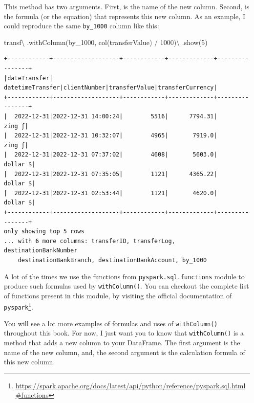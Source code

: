\documentclass[
  11pt,
  letterpaper,
  DIV=11,
  numbers=noendperiod]{scrreprt}
\newenvironment{Shaded}{\begin{snugshade}}{\end{snugshade}}
\newcommand{\DecValTok}[1]{\textcolor[rgb]{0.68,0.00,0.00}{#1}}
\newcommand{\NormalTok}[1]{\textcolor[rgb]{0.00,0.23,0.31}{#1}}
\newcommand{\OperatorTok}[1]{\textcolor[rgb]{0.37,0.37,0.37}{#1}}
\newcommand{\StringTok}[1]{\textcolor[rgb]{0.13,0.47,0.30}{#1}}
\begin{document}
This method has two arguments. First, is the name of the new column.
Second, is the formula (or the equation) that represents this new
column. As an example, I could reproduce the same \texttt{by\_1000}
column like this:

\begin{Shaded}
\begin{Highlighting}[]
\NormalTok{transf}\OperatorTok{\textbackslash{}}
\NormalTok{  .withColumn(}\StringTok{\textquotesingle{}by\_1000\textquotesingle{}}\NormalTok{, col(}\StringTok{\textquotesingle{}transferValue\textquotesingle{}}\NormalTok{) }\OperatorTok{/} \DecValTok{1000}\NormalTok{)}\OperatorTok{\textbackslash{}}
\NormalTok{  .show(}\DecValTok{5}\NormalTok{)}
\end{Highlighting}
\end{Shaded}

\begin{verbatim}
+------------+-------------------+------------+-------------+----------------+
|dateTransfer|   datetimeTransfer|clientNumber|transferValue|transferCurrency|
+------------+-------------------+------------+-------------+----------------+
|  2022-12-31|2022-12-31 14:00:24|        5516|      7794.31|          zing ƒ|
|  2022-12-31|2022-12-31 10:32:07|        4965|       7919.0|          zing ƒ|
|  2022-12-31|2022-12-31 07:37:02|        4608|       5603.0|        dollar $|
|  2022-12-31|2022-12-31 07:35:05|        1121|      4365.22|        dollar $|
|  2022-12-31|2022-12-31 02:53:44|        1121|       4620.0|        dollar $|
+------------+-------------------+------------+-------------+----------------+
only showing top 5 rows
... with 6 more columns: transferID, transferLog, destinationBankNumber
    destinationBankBranch, destinationBankAccount, by_1000
\end{verbatim}

A lot of the times we use the functions from
\texttt{pyspark.sql.functions} module to produce such formulas used by
\texttt{withColumn()}. You can checkout the complete list of functions
present in this module, by visiting the official documentation of
\texttt{pyspark}\footnote{\url{https://spark.apache.org/docs/latest/api/python/reference/pyspark.sql.html\#functions}}.

You will see a lot more examples of formulas and uses of
\texttt{withColumn()} throughout this book. For now, I just want you to
know that \texttt{withColumn()} is a method that adds a new column to
your DataFrame. The first argument is the name of the new column, and,
the second argument is the calculation formula of this new column.
\end{document}
